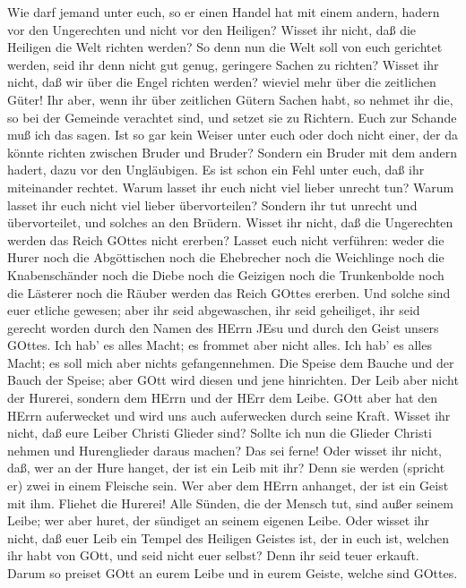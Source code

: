  Wie darf jemand unter euch, so er einen Handel hat mit
einem andern, hadern vor den Ungerechten und nicht vor den Heiligen?
 Wisset ihr nicht, daß die Heiligen die Welt richten werden?
So denn nun die Welt soll von euch gerichtet werden, seid ihr denn nicht
gut genug, geringere Sachen zu richten?  Wisset ihr nicht,
daß wir über die Engel richten werden? wieviel mehr über die zeitlichen
Güter!  Ihr aber, wenn ihr über zeitlichen Gütern Sachen
habt, so nehmet ihr die, so bei der Gemeinde verachtet sind, und setzet
sie zu Richtern.  Euch zur Schande muß ich das sagen. Ist so
gar kein Weiser unter euch oder doch nicht einer, der da könnte richten
zwischen Bruder und Bruder?  Sondern ein Bruder mit dem
andern hadert, dazu vor den Ungläubigen.  Es ist schon ein
Fehl unter euch, daß ihr miteinander rechtet. Warum lasset ihr euch
nicht viel lieber unrecht tun? Warum lasset ihr euch nicht viel lieber
übervorteilen?  Sondern ihr tut unrecht und übervorteilet,
und solches an den Brüdern.  Wisset ihr nicht, daß die
Ungerechten werden das Reich GOttes nicht ererben? Lasset euch nicht
verführen: weder die Hurer noch die Abgöttischen noch die Ehebrecher
noch die Weichlinge noch die Knabenschänder  noch die Diebe
noch die Geizigen noch die Trunkenbolde noch die Lästerer noch die
Räuber werden das Reich GOttes ererben.  Und solche sind
euer etliche gewesen; aber ihr seid abgewaschen, ihr seid geheiliget,
ihr seid gerecht worden durch den Namen des HErrn JEsu und durch den
Geist unsers GOttes.  Ich hab' es alles Macht; es frommet
aber nicht alles. Ich hab' es alles Macht; es soll mich aber nichts
gefangennehmen.  Die Speise dem Bauche und der Bauch der
Speise; aber GOtt wird diesen und jene hinrichten. Der Leib aber nicht
der Hurerei, sondern dem HErrn und der HErr dem Leibe. 
GOtt aber hat den HErrn auferwecket und wird uns auch auferwecken durch
seine Kraft.  Wisset ihr nicht, daß eure Leiber Christi
Glieder sind? Sollte ich nun die Glieder Christi nehmen und Hurenglieder
daraus machen? Das sei ferne!  Oder wisset ihr nicht, daß,
wer an der Hure hanget, der ist ein Leib mit ihr? Denn sie werden
(spricht er) zwei in einem Fleische sein.  Wer aber dem
HErrn anhanget, der ist ein Geist mit ihm.  Fliehet die
Hurerei! Alle Sünden, die der Mensch tut, sind außer seinem Leibe; wer
aber huret, der sündiget an seinem eigenen Leibe.  Oder
wisset ihr nicht, daß euer Leib ein Tempel des Heiligen Geistes ist, der
in euch ist, welchen ihr habt von GOtt, und seid nicht euer selbst?
 Denn ihr seid teuer erkauft. Darum so preiset GOtt an
eurem Leibe und in eurem Geiste, welche sind GOttes.

